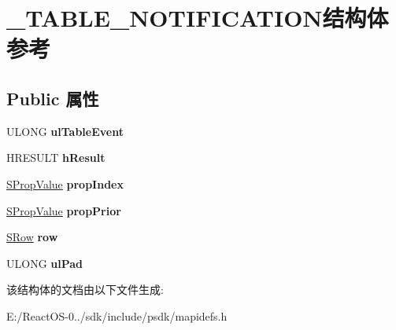 \hypertarget{struct___t_a_b_l_e___n_o_t_i_f_i_c_a_t_i_o_n}{}\section{\+\_\+\+T\+A\+B\+L\+E\+\_\+\+N\+O\+T\+I\+F\+I\+C\+A\+T\+I\+O\+N结构体 参考}
\label{struct___t_a_b_l_e___n_o_t_i_f_i_c_a_t_i_o_n}
\subsection*{Public 属性}
\begin{DoxyCompactItemize}
\item 
\mbox{\label{struct___t_a_b_l_e___n_o_t_i_f_i_c_a_t_i_o_n_a65b9105a16189082bd9598430b3bd18b}} 
U\+L\+O\+NG {\bfseries ul\+Table\+Event}
\item 
\mbox{\label{struct___t_a_b_l_e___n_o_t_i_f_i_c_a_t_i_o_n_a89da4614ad45bced58f7c31a55ac2207}} 
H\+R\+E\+S\+U\+LT {\bfseries h\+Result}
\item 
\mbox{\label{struct___t_a_b_l_e___n_o_t_i_f_i_c_a_t_i_o_n_a7c514f0771f153d9cd081d5fc49f57d0}} 
\hyperlink{struct___s_prop_value}{S\+Prop\+Value} {\bfseries prop\+Index}
\item 
\mbox{\label{struct___t_a_b_l_e___n_o_t_i_f_i_c_a_t_i_o_n_a8b73160d2beffcd77d5c0d2de242e8b9}} 
\hyperlink{struct___s_prop_value}{S\+Prop\+Value} {\bfseries prop\+Prior}
\item 
\mbox{\label{struct___t_a_b_l_e___n_o_t_i_f_i_c_a_t_i_o_n_a374df7586053f74705611770a1b8b5f5}} 
\hyperlink{struct___s_row}{S\+Row} {\bfseries row}
\item 
\mbox{\label{struct___t_a_b_l_e___n_o_t_i_f_i_c_a_t_i_o_n_a9b9df96fede7d4af7c95cd67f6bf9a70}} 
U\+L\+O\+NG {\bfseries ul\+Pad}
\end{DoxyCompactItemize}


该结构体的文档由以下文件生成\+:\begin{DoxyCompactItemize}
\item 
E\+:/\+React\+O\+S-\/0../sdk/include/psdk/mapidefs.\+h\end{DoxyCompactItemize}
